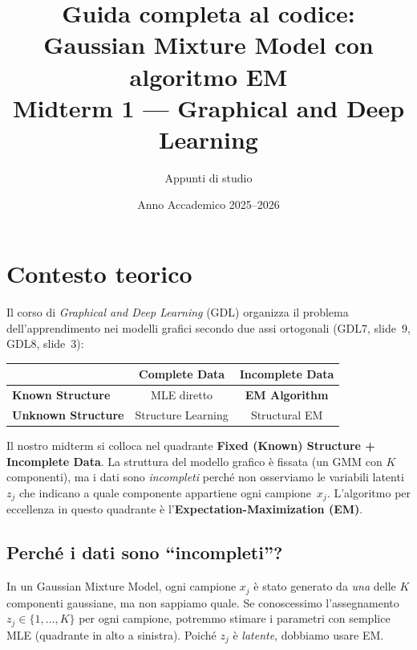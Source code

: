 \documentclass[11pt,a4paper]{article}
\title{\textbf{Guida completa al codice:\\
Gaussian Mixture Model con algoritmo EM}\\[6pt]
\large Midterm 1 --- Graphical and Deep Learning}
\author{Appunti di studio}
\date{Anno Accademico 2025--2026}
\newcommand{\refslide}[2]{\textsc{#1}, slide~#2}
\begin{document}
\maketitle
\tableofcontents
\newpage

\section{Contesto teorico}\label{sec:contesto}

Il corso di \emph{Graphical and Deep Learning} (GDL) organizza il problema
dell'apprendimento nei modelli grafici secondo due assi ortogonali
(\refslide{GDL7}{9}, \refslide{GDL8}{3}):

\begin{center}
\begin{tabular}{l|cc}
\toprule
 & \textbf{Complete Data} & \textbf{Incomplete Data} \\
\midrule
\textbf{Known Structure}   & MLE diretto          & \textbf{EM Algorithm} \\
\textbf{Unknown Structure}  & Structure Learning   & Structural EM \\
\bottomrule
\end{tabular}
\end{center}

\begin{infobox}
Il nostro midterm si colloca nel quadrante \textbf{Fixed (Known) Structure +
Incomplete Data}. La struttura del modello grafico è fissata (un GMM con
$K$ componenti), ma i dati sono \emph{incompleti} perché non osserviamo le
variabili latenti~$z_j$ che indicano a quale componente appartiene ogni
campione~$x_j$. L'algoritmo per eccellenza in questo quadrante è
l'\textbf{Expectation-Maximization (EM)}.
\end{infobox}

\subsection{Perché i dati sono ``incompleti''?}

In un Gaussian Mixture Model, ogni campione $x_j$ è stato generato da
\emph{una} delle $K$ componenti gaussiane, ma non sappiamo quale. Se
conoscessimo l'assegnamento $z_j \in \{1,\ldots,K\}$ per ogni campione,
potremmo stimare i parametri con semplice MLE (quadrante in alto a sinistra).
Poiché $z_j$ è \emph{latente}, dobbiamo usare EM.
\end{document}
